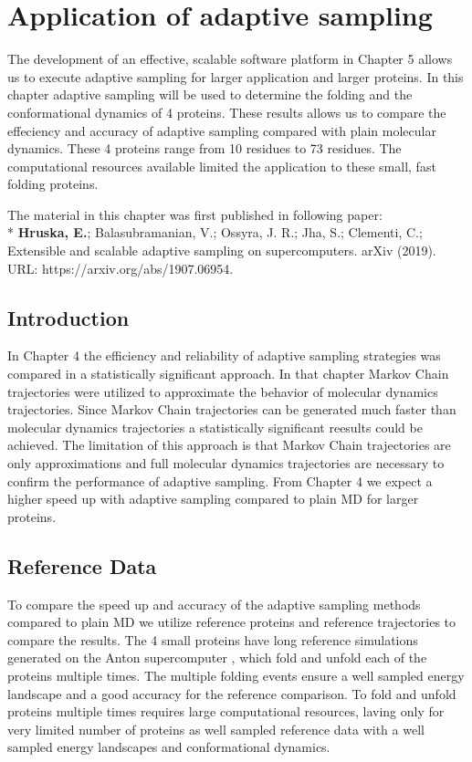 \afterpage{\null\newpage}
\chapter{Application of adaptive sampling\label{ch:chapter5}}

The development of an effective, scalable software platform in Chapter 5 allows us to execute adaptive sampling for larger application and larger proteins.
In this chapter adaptive sampling will be used to determine the folding and the conformational dynamics of 4 proteins. These results allows us to compare the effeciency and accuracy of adaptive sampling compared with plain molecular dynamics.  These 4 proteins range from 10 residues to 73 residues. The computational resources available limited the application to these small, fast folding proteins. 

The material in this chapter was first published in following paper: 
\\*
\cite{Extasy2019} \textbf{Hruska, E.}; Balasubramanian, V.; Ossyra, J. R.; Jha, S.; Clementi, C.; Extensible
and scalable adaptive sampling on supercomputers. arXiv (2019). URL: https://arxiv.org/abs/1907.06954.


\section{\label{sec:intro5}Introduction}
  
In Chapter 4 the efficiency and reliability of adaptive sampling strategies was compared in a statistically significant approach.  In that chapter Markov Chain trajectories were utilized to approximate the behavior of molecular dynamics trajectories. Since Markov Chain trajectories can be generated much faster than molecular dynamics trajectories a statistically significant reesults could be achieved. The limitation of this approach is that Markov Chain trajectories are only approximations and full molecular dynamics trajectories are necessary to confirm the performance of adaptive sampling. From Chapter 4 we expect a higher speed up with adaptive sampling\cite{Adstrategies2018} compared to plain MD for larger proteins.

\section{\label{sec:Reference}Reference Data}



To compare the speed up and accuracy of the adaptive sampling methods compared to plain MD we utilize reference proteins and reference trajectories to compare the results.
The 4 small proteins have long reference simulations generated on the Anton supercomputer \cite{lindorff2011}, which fold and unfold each of the proteins multiple times. The multiple folding events ensure a well sampled energy landscape and a good accuracy for the reference comparison. To fold and unfold proteins multiple times requires large computational resources, laving only for very limited number of proteins as well sampled reference data with a well sampled energy landscapes and conformational dynamics.

